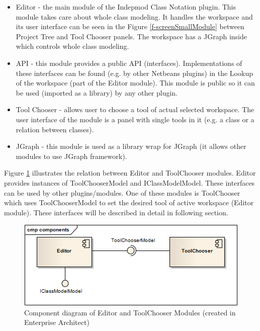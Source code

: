 \begin{itemize}
	\item Editor - the main module of the Indepmod Class Notation plugin. This module takes care about whole class modeling. It handles the workspace and its user interface can be seen in the Figure \ref{f-screenSmallModule} between Project Tree and Tool Chooser panels. The workspace has a JGraph inside which controls whole class modeling.
    \item API - this module provides a public API (interfaces). Implementations of these interfaces can be found (e.g. by other Netbeans plugins) in the Lookup of the workspace (part of the Editor module). This module is public so it can be used (imported as a library) by any other plugin.
    \item Tool Chooser - allows user to choose a tool of actual selected workspace. The user interface of the module is a panel with single tools in it (e.g. a class or a relation between classes).
    \item JGraph - this module is used as a library wrap for JGraph (it allows other modules to use JGraph framework).
\end{itemize} 

Figure \ref{f-Editor_ToolChooser_Components} illustrates the relation between Editor and ToolChooser modules. Editor provides instances of ToolChooserModel and IClassModelModel. These interfaces can be used by other plugins/modules. One of these modules is ToolChooser which uses ToolChooserModel to set the desired tool of active workspace (Editor module). These interfaces will be described in detail in following section.

\begin{figure}[!ht]
\begin{center}
\includegraphics{img/Editor_ToolChooser_Components.png}
\caption{Component diagram of Editor and ToolChooser Modules (created in Enterprise Architect)}
\label{f-Editor_ToolChooser_Components}
\end{center}
\end{figure}

